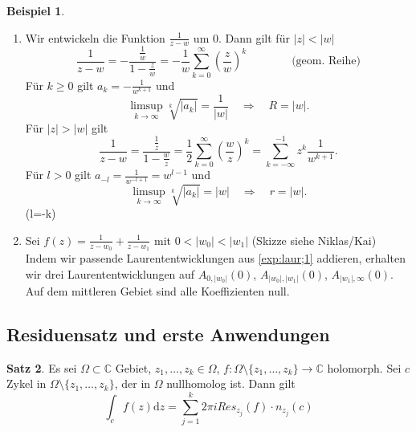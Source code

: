 \documentclass[11pt,titlepage]{article}
\theoremstyle{definition}
\newtheorem{theorem}{Satz}[section]
\newtheorem{example}[theorem]{Beispiel}
\theoremstyle{remark}
\begin{document}
	\begin{example}
		\begin{enumerate}
			\item \label{exp:laur;1} Wir entwickeln die Funktion $\frac{1}{z-w}$ um $0$. Dann gilt für $|z|<|w|$
			\[ \frac{1}{z-w} = -\frac{\frac{1}{w}}{1-\frac{z}{w}}=-\frac{1}{w} \sum_{k=0}^{\infty} 
			\left(\frac{z}{w}\right)^k \qquad \qquad \text{(geom. Reihe)} \]
			Für $k\geq 0$ gilt $a_k=-\frac{1}{w^{k+1}}$ und 
			\[ \limsup_{k\to\infty}\sqrt[k]{|a_k|} =\frac{1}{|w|} \quad\Rightarrow\quad R=|w|. \]
			Für $|z|>|w|$ gilt
			\[ \frac{1}{z-w}=\frac{\frac{1}{z}}{1-\frac{w}{z}} =\frac{1}{2}\sum_{k=0}^{\infty}\left(\frac{w}{z}\right)^k 
			=\sum_{k=-\infty}^{-1} z^k \frac{1}{w^{k+1}}. \]
			Für $l>0$ gilt $a_{-l}=\frac{1}{w^{-l+1}}=w^{l-1}$ und
			\[ \limsup_{k\to\infty}\sqrt[k]{|a_k|}=|w| \quad\Rightarrow\quad r=|w|. \]
			(l=-k)
			
			\item Sei $f(z)=\frac{1}{z-w_0}+\frac{1}{z-w_1}$ mit $0<|w_0|<|w_1|$ (Skizze siehe Niklas/Kai) \\
			Indem wir passende Laurententwicklungen aus \ref{exp:laur;1} addieren, erhalten wir drei 
			Laurententwicklungen auf $A_{0,|w_0|}(0)$, $A_{|w_0|,|w_1|}(0)$, $A_{|w_1|,\infty}(0)$. 
			Auf dem mittleren Gebiet sind alle Koeffizienten null.
		\end{enumerate}
	\end{example}
	
	
	
	
	
	
	
	\subsection{Residuensatz und erste Anwendungen}
	
	\begin{theorem}
		Es sei $\Omega\subset\mathbb{C}$ Gebiet, $z_1,\ldots ,z_k\in\Omega$, $f:\Omega\setminus
		\{z_1,\ldots ,z_k\}\to\mathbb{C}$ holomorph. Sei $c$ Zykel in $\Omega\setminus\{z_1,\ldots,z_k\}$, 
		der in $\Omega$ nullhomolog ist. Dann gilt
		\[ \int_c f(z)\mathrm{d}z =\sum_{j=1}^k 2\pi i Res_{z_j}(f)\cdot n_{z_j}(c) \]
	\end{theorem}
	
\end{document}
